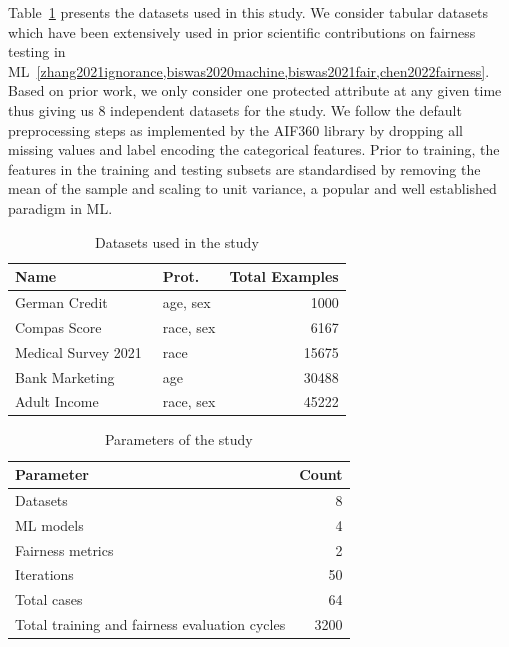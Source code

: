 \documentclass{article}
\begin{document}
Table \ref{tab:datasets} presents the datasets used in this study. We
consider tabular datasets which have been extensively used in prior
scientific contributions on fairness testing in
ML \ref{zhang2021ignorance,biswas2020machine,biswas2021fair,chen2022fairness}.
Based on prior work, we only consider one protected attribute at any
given time thus giving us 8 independent datasets for the study. We
follow the default preprocessing steps as implemented by the AIF360
library by dropping all missing values and label encoding the
categorical features. Prior to training, the features in the training
and testing subsets are standardised by removing the mean of the
sample and scaling to unit variance, a popular and well established
paradigm in ML.

\begin{table}
  \centering
  \caption{Datasets used in the study}
  \begin{tabular}{l l r}
    \toprule
    \textbf{Name} & \textbf{Prot.} & \textbf{Total Examples}\\
    \midrule
    German Credit \cite{CITEME} & age, sex & 1000\\
    Compas Score \cite{CITEME} & race, sex & 6167\\
    Medical Survey 2021 \cite{CITEME} & race & 15675\\
    Bank Marketing \cite{CITEME} & age & 30488\\
    Adult Income \cite{CITEME} & race, sex & 45222\\
    \bottomrule
  \end{tabular}
  \label{tab:datasets}
\end{table}

\begin{table}
  \centering
  \caption{Parameters of the study}
  \begin{tabular}{lr}
    \toprule
    \textbf{Parameter} & \textbf{Count}\\
    \midrule
    Datasets & 8\\
    ML models & 4\\
    Fairness metrics & 2\\
    Iterations & 50\\
    Total cases & 64\\
    Total training and fairness evaluation cycles & 3200\\
    \bottomrule
  \end{tabular}
  \label{tab:parameters}
\end{table}
\end{document}

